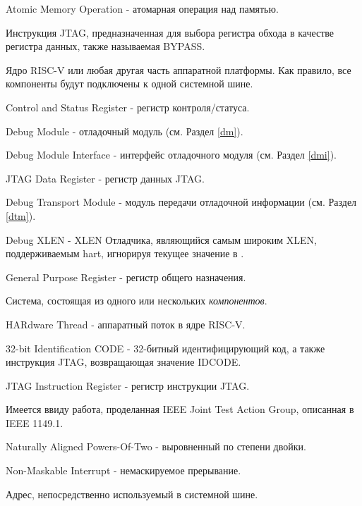 \begin{description}[style=nextline]
    \item[AMO]
        Atomic Memory Operation - атомарная операция над памятью.
    \item[BYPASS]
        Инструкция JTAG, предназначенная для выбора регистра обхода в качестве регистра данных, также называемая BYPASS.
    \item[компонент]
        Ядро RISC-V или любая другая часть аппаратной платформы.
        Как правило, все компоненты будут подключены к одной системной
        шине.
    \item[CSR]
        Control and Status Register - регистр контроля/статуса.
    \item[DM]
        Debug Module - отладочный модуль (см. Раздел \ref{dm}).
    \item[DMI]
        Debug Module Interface - интерфейс отладочного модуля (см. Раздел \ref{dmi}).
    \item[DR]
        JTAG Data Register - регистр данных JTAG.
    \item[DTM]
        Debug Transport Module - модуль передачи отладочной информации (см. Раздел \ref{dtm}).
    \item[DXLEN]
        Debug XLEN - XLEN Отладчика, являющийся самым широким XLEN,
        поддерживаемым hart, игнорируя текущее значение \Fmxl в \Rmisa.
    \item[GPR]
        General Purpose Register - регистр общего назначения.
    \item[аппаратная платформа]
        Система, состоящая из одного или нескольких \emph{компонентов}.
    \item[hart]
        HARdware Thread - аппаратный поток в ядре RISC-V.
    \item[IDCODE]
        32-bit Identification CODE - 32-битный идентифицирующий код, а также инструкция JTAG,
        возвращающая значение IDCODE.
    \item[IR]
        JTAG Instruction Register - регистр инструкции JTAG.
    \item[JTAG]
        Имеется ввиду работа, проделанная IEEE Joint Test Action Group, описанная в
        IEEE 1149.1.
    \item[NAPOT]
        Naturally Aligned Powers-Of-Two - выровненный по степени двойки.
    \item[NMI]
        Non-Maskable Interrupt - немаскируемое прерывание.
    \item[физический адрес]
        Адрес, непосредственно используемый в системной шине.

\end{description}
